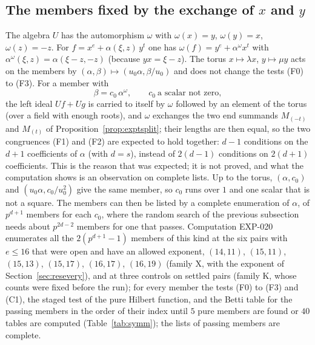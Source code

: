 \documentclass[11pt]{article}
\theoremstyle{definition}
\theoremstyle{remark}
\newcommand{\EXP}[1]{\mbox{EXP-#1}}
\begin{document}
\subsection{The members fixed by the exchange of \texorpdfstring{$x$ and $y$}{x and y}}
\label{sec:ressymm}

The algebra $U$ has the automorphism $\omega$ with $\omega(x)=y$, $\omega(y)=x$, $\omega(z)=-z$. For $f=x^e+\alpha(\xi,z)\,y^t$ one has $\omega(f)=y^e+\alpha^\omega x^t$ with $\alpha^\omega(\xi,z)=\alpha(\xi-z,-z)$ (because $yx=\xi-z$). The torus $x\mapsto\lambda x$, $y\mapsto\mu y$ acts on the members by $(\alpha,\beta)\mapsto(u_0\alpha,\beta/u_0)$ and does not change the tests (F0) to (F3). For a member with
\[
\beta=c_0\,\alpha^\omega,\qquad c_0\ \text{a scalar not zero},
\]
the left ideal $Uf+Ug$ is carried to itself by $\omega$ followed by an element of the torus (over a field with enough roots), and $\omega$ exchanges the two end summands $M_{(-t)}$ and $M_{(t)}$ of Proposition~\ref{prop:exptsplit}; their lengths are then equal, so the two congruences (F1) and (F2) are expected to hold together: $d-1$ conditions on the $d+1$ coefficients of $\alpha$ (with $d=s$), instead of $2(d-1)$ conditions on $2(d+1)$ coefficients. This is the reason that was expected; it is not proved, and what the computation shows is an observation on complete lists. Up to the torus, $(\alpha,c_0)$ and $(u_0\alpha,c_0/u_0^2)$ give the same member, so $c_0$ runs over $1$ and one scalar that is not a square. The members can then be listed by a complete enumeration of $\alpha$, of $p^{d+1}$ members for each $c_0$, where the random search of the previous subsection needs about $p^{2d-2}$ members for one that passes. Computation \EXP{020} enumerates all the $2(p^{d+1}-1)$ members of this kind at the six pairs with $e\le16$ that were open and have an allowed exponent, $(14,11)$, $(15,11)$, $(15,13)$, $(15,17)$, $(16,17)$, $(16,19)$ (family X, with the exponent of Section~\ref{sec:resevery}), and at three controls on settled pairs (family K, whose counts were fixed before the run); for every member the tests (F0) to (F3) and (C1), the staged test of the pure Hilbert function, and the Betti table for the passing members in the order of their index until $5$ pure members are found or $40$ tables are computed (Table~\ref{tab:symm}); the lists of passing members are complete.

\begin{table}[htbp]
\centering\scriptsize

\caption{The nine complete lists of \EXP{020}: the family (K controls, X open pairs), the pair, the exponent $t$, the number of members $2(p^{d+1}-1)$, those with (F0), those that also pass (F1) and (F2) (the two columns are equal), the members with (F0) where (F1) and (F2) differ, the members that pass (F0) to (F3), those among them with (C1), those with the pure Hilbert function, the Betti tables computed and the pure ones.}
\label{tab:symm}
\end{table}
\end{document}
